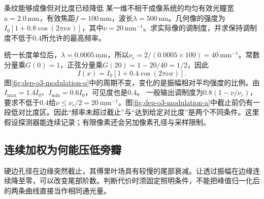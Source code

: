 \begin{example}条纹能够成像但对比度已经降低
某一维不相干成像系统的均匀有效光瞳宽$a=2.0\,\mathrm{mm}$，有效焦距$f=100\,\mathrm{mm}$，波长$\lambda=500\,\mathrm{nm}$。几何像的强度为$I_0[1+0.8\cos(2\pi\nu x)]$，其中$\nu=20\,\mathrm{mm}^{-1}$。求实际像的调制度，并求保持调制度不低于0.4所允许的最高频率。
\end{example}
\begin{solution}
统一长度单位后，$\lambda=0.0005\,\mathrm{mm}$，所以$\nu_c=2/(0.0005\times100)=40\,\mathrm{mm}^{-1}$。常数分量乘$G(0)=1$，正弦分量乘$G(20)=1-20/40=1/2$，因此
\[
 I(x)=I_0[1+0.4\cos(2\pi\nu x)].
\]
图\ref{fig:dep-o3-modulation-q}中的周期不变，变化的是振幅相对平均强度的比例。由$I_{\max}=1.4I_0$、$I_{\min}=0.6I_0$，可见度也是0.4。
一般输出调制度为$0.8(1-\nu/\nu_c)$，要求不低于0.4给$\nu\leq\nu_c/2=20\,\mathrm{mm}^{-1}$。图\ref{fig:dep-o3-modulation-a}中截止前仍有一段低对比度区。因此“频率未超过截止”与“达到给定对比度”是两个不同条件。这里假设探测器能连续记录；有限像素还会另加像素孔径与采样限制。
\end{solution}

\subsection{连续加权为何能压低旁瓣}
硬边孔径在边缘突然截止，其傅里叶场具有较慢的尾部衰减。让透过振幅在边缘连续降至零，可以改变尾部阶数。判断代价时须固定照明条件，不能把峰值归一化后的两条曲线直接当作相同通光量。

